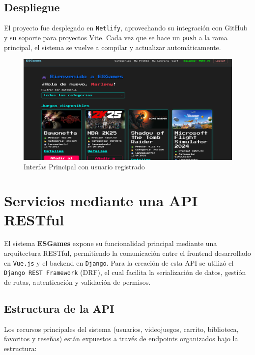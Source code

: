 \documentclass{article}
\begin{document}
\subsection{Despliegue}

El proyecto fue desplegado en \texttt{Netlify}, aprovechando su integración con GitHub y su soporte para proyectos Vite. Cada vez que se hace un \texttt{push} a la rama principal, el sistema se vuelve a compilar y actualizar automáticamente.
\begin{figure}[H]
    \centering
    \includegraphics[width=0.9\linewidth]{img/webb.png}
    \caption{Interfas Principal con usuario registrado}
\end{figure}

\section{Servicios mediante una API RESTful}

El sistema \textbf{ESGames} expone su funcionalidad principal mediante una arquitectura RESTful, permitiendo la comunicación entre el frontend desarrollado en \texttt{Vue.js} y el backend en \texttt{Django}. Para la creación de esta API se utilizó el \texttt{Django REST Framework} (DRF), el cual facilita la serialización de datos, gestión de rutas, autenticación y validación de permisos.

\subsection{Estructura de la API}

Los recursos principales del sistema (usuarios, videojuegos, carrito, biblioteca, favoritos y reseñas) están expuestos a través de endpoints organizados bajo la estructura:
\end{document}
